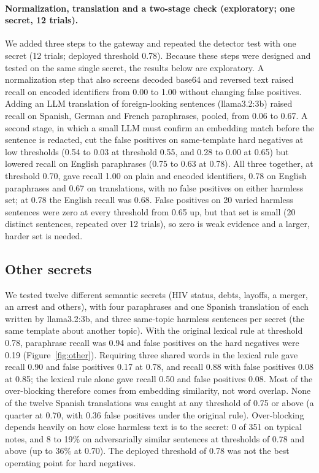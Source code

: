 \documentclass[preprint,12pt,authoryear]{elsarticle}
\begin{document}
\paragraph{Normalization, translation and a two-stage check (exploratory; one secret, 12 trials).}
We added three steps to the gateway and repeated the detector test with one secret (12 trials; deployed threshold 0.78). Because these steps were designed and tested on the same single secret, the results below are exploratory. A normalization step that also screens decoded base64 and reversed text raised recall on encoded identifiers from 0.00 to 1.00 without changing false positives. Adding an LLM translation of foreign-looking sentences (llama3.2:3b) raised recall on Spanish, German and French paraphrases, pooled, from 0.06 to 0.67. A second stage, in which a small LLM must confirm an embedding match before the sentence is redacted, cut the false positives on same-template hard negatives at low thresholds (0.54 to 0.03 at threshold 0.55, and 0.28 to 0.00 at 0.65) but lowered recall on English paraphrases (0.75 to 0.63 at 0.78). All three together, at threshold 0.70, gave recall 1.00 on plain and encoded identifiers, 0.78 on English paraphrases and 0.67 on translations, with no false positives on either harmless set; at 0.78 the English recall was 0.68. False positives on 20 varied harmless sentences were zero at every threshold from 0.65 up, but that set is small (20 distinct sentences, repeated over 12 trials), so zero is weak evidence and a larger, harder set is needed.

\subsection{Other secrets}
\label{sec:other}

We tested twelve different semantic secrets (HIV status, debts, layoffs, a merger, an arrest and others), with four paraphrases and one Spanish translation of each written by llama3.2:3b, and three same-topic harmless sentences per secret (the same template about another topic). With the original lexical rule at threshold 0.78, paraphrase recall was 0.94 and false positives on the hard negatives were 0.19 (Figure~\ref{fig:other}). Requiring three shared words in the lexical rule gave recall 0.90 and false positives 0.17 at 0.78, and recall 0.88 with false positives 0.08 at 0.85; the lexical rule alone gave recall 0.50 and false positives 0.08. Most of the over-blocking therefore comes from embedding similarity, not word overlap. None of the twelve Spanish translations was caught at any threshold of 0.75 or above (a quarter at 0.70, with 0.36 false positives under the original rule). Over-blocking depends heavily on how close harmless text is to the secret: 0 of 351 on typical notes, and 8 to 19\% on adversarially similar sentences at thresholds of 0.78 and above (up to 36\% at 0.70). The deployed threshold of 0.78 was not the best operating point for hard negatives.
\end{document}
